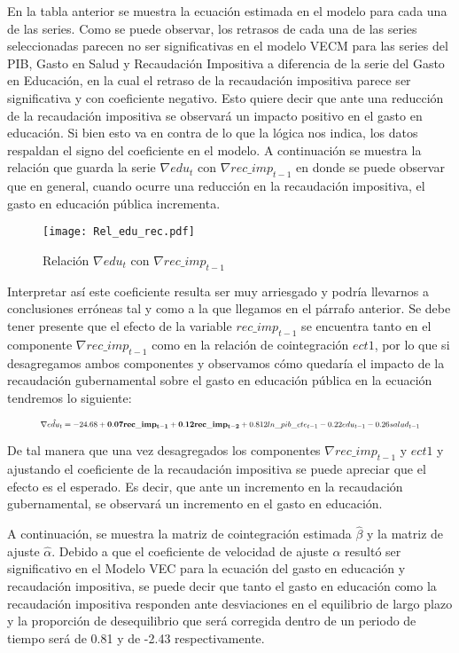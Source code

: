 En la tabla anterior se muestra la ecuación estimada en el modelo para cada una de las series. Como se puede observar, los retrasos de cada una de las series seleccionadas parecen no ser significativas en el modelo VECM para las series del PIB, Gasto en Salud y Recaudación Impositiva a diferencia de la serie del Gasto en Educación, en la cual el retraso de la recaudación impositiva parece ser significativa y con coeficiente negativo. Esto quiere decir que ante una reducción de la recaudación impositiva se observará un impacto positivo en el gasto en educación. Si bien esto va en contra de lo que la lógica nos indica, los datos respaldan el signo del coeficiente en el modelo. A continuación se muestra la relación que guarda la serie $\nabla edu_t$ con $\nabla rec\_imp_{t-1}$ en donde se puede observar que en general, cuando ocurre una reducción en la recaudación impositiva, el gasto en educación pública incrementa.


\begin{figure}[H]
\centering
\texttt{[image: Rel\_edu\_rec.pdf]}
\caption{Relación $\nabla edu_t$ con $\nabla rec\_imp_{t-1}$}
\label{rel_edu_recl}
\end{figure}

Interpretar así este coeficiente resulta ser muy arriesgado y podría llevarnos a conclusiones erróneas tal y como a la que llegamos en el párrafo anterior. Se debe tener presente que el efecto de la variable $rec\_imp_{t-1}$ se encuentra tanto en el componente $\nabla rec\_imp_{t-1}$ como en la relación de cointegración $ect1$, por lo que si desagregamos ambos componentes y observamos cómo quedaría el impacto de la recaudación gubernamental sobre el gasto en educación pública en la ecuación tendremos lo siguiente:

\begin{equation}
\resizebox{.9 \textwidth}{!} 
{
$\nabla \hat{edu_t} = -24.68 + \mathbf{0.07 rec\_imp_{t-1} + 0.12 rec\_imp_{t-2}} + 0.812 ln\_pib\_cte_{t-1} - 0.22 edu_{t-1} - 0.26 salud_{t-1} $
}
\end{equation}

De tal manera que una vez desagregados los componentes $\nabla rec\_imp_{t-1}$ y $ect1$ y ajustando el coeficiente de la recaudación impositiva se puede apreciar que el efecto es el esperado. Es decir, que ante un incremento en la recaudación gubernamental, se observará un incremento en el gasto en educación.\bigskip 


A continuación, se muestra la matriz de cointegración estimada $\hat{\beta}$ y la matriz de ajuste $\hat{\alpha}$. Debido a que el coeficiente de velocidad de ajuste $\alpha$ resultó ser significativo en el Modelo VEC para la ecuación del gasto en educación y recaudación impositiva, se puede decir que tanto el gasto en educación como la recaudación impositiva responden ante desviaciones en el equilibrio de largo plazo y la proporción de desequilibrio que será corregida dentro de un periodo de tiempo será de 0.81 y de -2.43 respectivamente.

